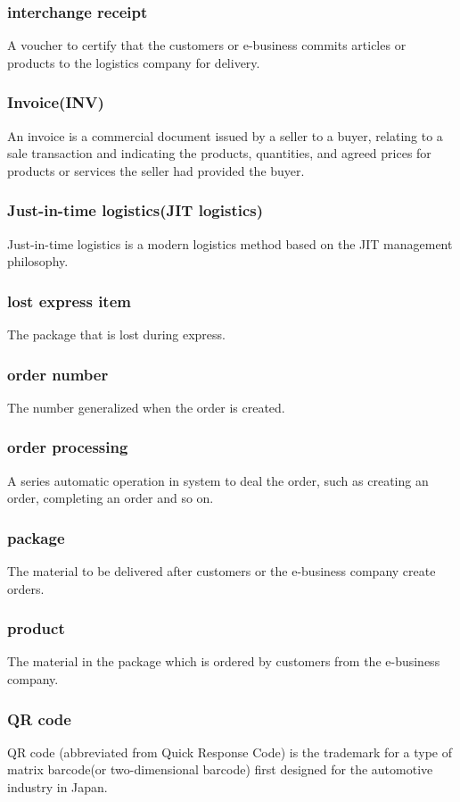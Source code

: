 \documentclass[12pt]{scrreprt}
\begin{document}
\begin{spacing}{0.7}
\subsubsection{interchange receipt}
A voucher to certify that the customers or e-business commits articles
or products to the logistics company for delivery.
\subsubsection{Invoice(INV)}
An invoice is a commercial document issued by a seller to a buyer,
relating to a sale transaction and indicating the products, quantities,
and agreed prices for products or services the seller had provided the buyer.
\subsubsection{Just-in-time logistics(JIT logistics)}
Just-in-time logistics is a modern logistics method based on the JIT
management philosophy.
\subsubsection{lost express item}
The package that is lost during express.
\subsubsection{order number}
The number generalized when the order is created.
\subsubsection{order processing}
A series automatic operation in system to deal the order, such as
creating an order, completing an order and so on.
\subsubsection{package}
The material to be delivered after customers or the e-business company
create orders.
\subsubsection{product}
The material in the package which is ordered by customers from the
e-business company.
\subsubsection{QR code}
QR code (abbreviated from Quick Response Code) is the trademark for
a type of matrix barcode(or two-dimensional barcode) first designed for
the automotive industry in Japan.

\end{spacing}
\end{document}
